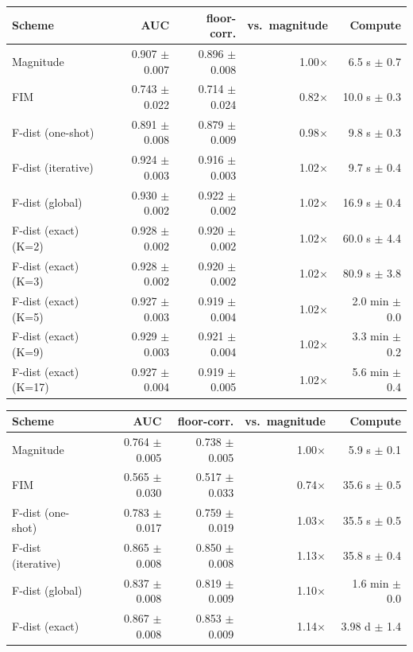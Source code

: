 \begin{tabular}{lrrrr}
\toprule
Scheme & AUC & floor-corr. & vs.\ magnitude & Compute \\
\midrule
Magnitude & 0.907 $\pm$ 0.007 & 0.896 $\pm$ 0.008 & 1.00$\times$ & 6.5 s $\pm$ 0.7 \\
FIM & 0.743 $\pm$ 0.022 & 0.714 $\pm$ 0.024 & 0.82$\times$ & 10.0 s $\pm$ 0.3 \\
F-dist (one-shot) & 0.891 $\pm$ 0.008 & 0.879 $\pm$ 0.009 & 0.98$\times$ & 9.8 s $\pm$ 0.3 \\
F-dist (iterative) & 0.924 $\pm$ 0.003 & 0.916 $\pm$ 0.003 & 1.02$\times$ & 9.7 s $\pm$ 0.4 \\
F-dist (global) & 0.930 $\pm$ 0.002 & 0.922 $\pm$ 0.002 & 1.02$\times$ & 16.9 s $\pm$ 0.4 \\
F-dist (exact) (K=2) & 0.928 $\pm$ 0.002 & 0.920 $\pm$ 0.002 & 1.02$\times$ & 60.0 s $\pm$ 4.4 \\
F-dist (exact) (K=3) & 0.928 $\pm$ 0.002 & 0.920 $\pm$ 0.002 & 1.02$\times$ & 80.9 s $\pm$ 3.8 \\
F-dist (exact) (K=5) & 0.927 $\pm$ 0.003 & 0.919 $\pm$ 0.004 & 1.02$\times$ & 2.0 min $\pm$ 0.0 \\
F-dist (exact) (K=9) & 0.929 $\pm$ 0.003 & 0.921 $\pm$ 0.004 & 1.02$\times$ & 3.3 min $\pm$ 0.2 \\
F-dist (exact) (K=17) & 0.927 $\pm$ 0.004 & 0.919 $\pm$ 0.005 & 1.02$\times$ & 5.6 min $\pm$ 0.4 \\
\bottomrule
\end{tabular}

\begin{tabular}{lrrrr}
\toprule
Scheme & AUC & floor-corr. & vs.\ magnitude & Compute \\
\midrule
Magnitude & 0.764 $\pm$ 0.005 & 0.738 $\pm$ 0.005 & 1.00$\times$ & 5.9 s $\pm$ 0.1 \\
FIM & 0.565 $\pm$ 0.030 & 0.517 $\pm$ 0.033 & 0.74$\times$ & 35.6 s $\pm$ 0.5 \\
F-dist (one-shot) & 0.783 $\pm$ 0.017 & 0.759 $\pm$ 0.019 & 1.03$\times$ & 35.5 s $\pm$ 0.5 \\
F-dist (iterative) & 0.865 $\pm$ 0.008 & 0.850 $\pm$ 0.008 & 1.13$\times$ & 35.8 s $\pm$ 0.4 \\
F-dist (global) & 0.837 $\pm$ 0.008 & 0.819 $\pm$ 0.009 & 1.10$\times$ & 1.6 min $\pm$ 0.0 \\
F-dist (exact) & 0.867 $\pm$ 0.008 & 0.853 $\pm$ 0.009 & 1.14$\times$ & 3.98 d $\pm$ 1.4 \\
\bottomrule
\end{tabular}

